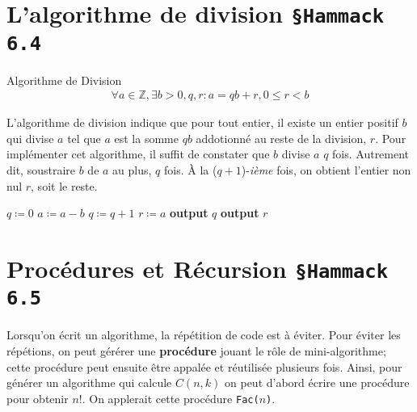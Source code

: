 \documentclass[16pt]{report}
\begin{document}
\begin{multicols*}{2}
        \section{L'algorithme de division \texttt{\small{\S Hammack 6.4}}}
        \begin{Theorem}{ Algorithme de Division}{}
            \begin{align*}
                \forall a \in \mathbb{Z}, \exists b > 0, q, r : a = qb + r, 0 \leq r < b
            \end{align*}
        \end{Theorem}
        L'algorithme de division indique que pour tout entier, il existe un entier positif $b$ qui divise 
        $a$ tel que $a$ est la somme $qb$ addotionné au reste de la division, $r$. Pour implémenter cet 
        algorithme, il suffit de constater que $b$ divise $a$ $q$ fois. Autrement dit, soustraire $b$ de $a$
        au plus, $q$ fois. À la ($q+1$)-\textit{ième} fois, on obtient l'entier non nul
        $r$, soit le reste. 


        \begin{algorithm}[H]
                        \caption{(Algorithme de Division)\label{alg:three2}}
                        \SetAlgoLined
                        \DontPrintSemicolon
                        $q \coloneqq 0$ \;
                         {
                            $a \coloneqq a - b$ \;
                            $q \coloneqq q + 1$ \;
                        }
                        $r \coloneqq a$ \; 
                        \textbf{output} $q$ \; 
                        \textbf{output} $r$ \;  

        \end{algorithm}
        
        \section{Procédures et Récursion \texttt{\small{\S Hammack 6.5}}}
        Lorsqu'on écrit un algorithme, la répétition de code est à éviter. Pour éviter les répétions, 
        on peut gérérer une \textbf{procédure} jouant le rôle de mini-algorithme; cette procédure peut 
        ensuite être appalée et réutilisée plusieurs fois. Ainsi, pour générer un algorithme qui 
        calcule $C(n, k)$ on peut d'abord écrire une procédure pour obtenir $n!$. On applerait cette procédure 
        \texttt{Fac($n$)}. 


\end{multicols*}
\end{document}

